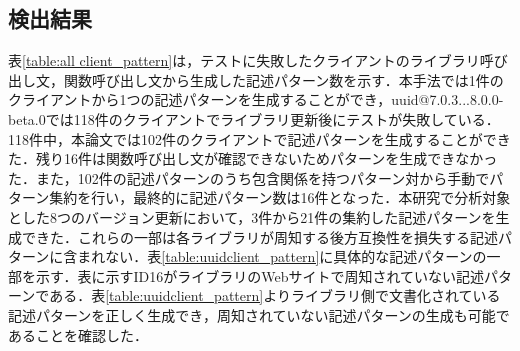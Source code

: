 \documentclass[T,J]{fose} %
\begin{document}
\subsection{検出結果}
表\ref{table:all client_pattern}は，テストに失敗したクライアントのライブラリ呼び出し文，関数呼び出し文から生成した記述パターン数を示す．本手法では1件のクライアントから1つの記述パターンを生成することができ，uuid@7.0.3...8.0.0-beta.0では118件のクライアントでライブラリ更新後にテストが失敗している．118件中，本論文では102件のクライアントで記述パターンを生成することができた．残り16件は関数呼び出し文が確認できないためパターンを生成できなかった．また，102件の記述パターンのうち包含関係を持つパターン対から手動でパターン集約を行い，最終的に記述パターン数は16件となった．本研究で分析対象とした8つのバージョン更新において，3件から21件の集約した記述パターンを生成できた．これらの一部は各ライブラリが周知する後方互換性を損失する記述パターンに含まれない．表\ref{table:uuidclient_pattern}に具体的な記述パターンの一部を示す．表に示すID16がライブラリのWebサイトで周知されていない記述パターンである．表\ref{table:uuidclient_pattern}よりライブラリ側で文書化されている記述パターンを正しく生成でき，周知されていない記述パターンの生成も可能であることを確認した．
\begin{table}[t]
    \caption{記述パターンにより検出できたクライアント数}
    \label{table:RQ2}
    \centering
\end{table}
\end{document}
